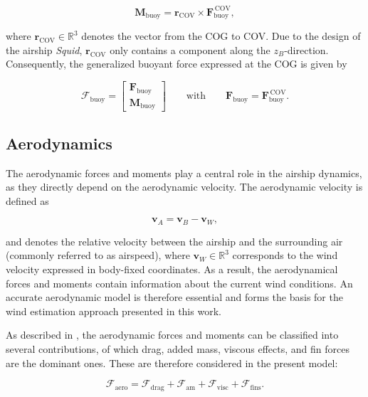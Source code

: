 \begin{equation}
	\bm{M}_\mathrm{buoy} = \bm{r}_\mathrm{COV} \times \bm{F}_\mathrm{buoy}^\mathrm{\, COV},
\end{equation}

where $\bm{r}_\mathrm{COV} \in \mathbb{R}^3$ denotes the vector from the COG to COV. Due to the design of
the airship \emph{Squid}, $\bm{r}_\mathrm{COV}$ only contains a component along the $z_B$-direction.
Consequently, the generalized buoyant force expressed at the COG is given by

\begin{equation}
	\bm{\mathcal{F}}_\mathrm{buoy}
	=
	\begin{bmatrix}
		\bm{F}_\mathrm{buoy} \\ 	\bm{M}_\mathrm{buoy}
	\end{bmatrix}
	\qquad
	\text{with}
	\qquad
	\bm{F}_\mathrm{buoy}
	=
	\bm{F}_\mathrm{buoy}^{\mathrm{\, COV}}.
\end{equation}





\subsection{Aerodynamics}
The aerodynamic forces and moments play a central role in the airship dynamics, as they directly depend on the aerodynamic velocity. The aerodynamic velocity is defined as 

\begin{equation}
	\bm{v}_A
	=
	\bm{v}_B - \bm{v}_W,
\end{equation} 

and denotes the relative velocity between the airship and the surrounding air (commonly referred to as airspeed), where $\bm{v}_W \in \mathbb{R}^3$ corresponds to the wind velocity expressed in body-fixed coordinates. As a result, the aerodynamical forces and moments contain information about the current wind conditions.
An accurate aerodynamic model is therefore essential and forms the basis for the wind estimation approach presented in this work.

As described in \cite{Li2007AirshipDynamics}, the aerodynamic forces and moments can be classified into several contributions, of which drag, added mass, viscous effects, and fin forces are the dominant ones. These are therefore considered in the present model:

\begin{equation}
	\bm{\mathcal{F}}_\mathrm{aero} 
	=
	\bm{\mathcal{F}}_\mathrm{drag} + \bm{\mathcal{F}}_\mathrm{am} + \bm{\mathcal{F}}_\mathrm{visc} + \bm{\mathcal{F}}_\mathrm{fins}.
\end{equation}

